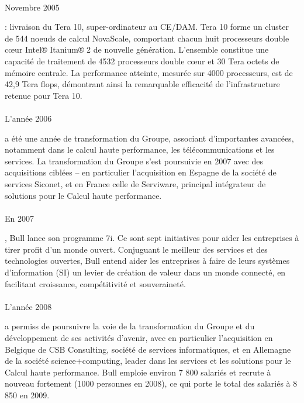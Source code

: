 \documentclass{article}
\begin{document}
		\paragraph{}
		\begin{bf}Novembre 2005\end{bf} : livraison du Tera 10, super-ordinateur au CE/DAM. Tera 10 forme un cluster de 
		544 noeuds de calcul NovaScale, comportant chacun huit processeurs double cœur Intel® Itanium® 2 de nouvelle 
		génération. L'ensemble constitue une capacité de traitement de 4532 processeurs double cœur et 30 Tera octets de 
		mémoire centrale. La performance atteinte, mesurée sur 4000 processeurs, est de 42,9 Tera flops, démontrant ainsi la 
		remarquable efficacité de l’infrastructure retenue pour Tera 10.
		\paragraph{}
		\begin{bf}L’année 2006\end{bf} a été une année de transformation du Groupe, associant d’importantes avancées, 
		notamment dans le calcul haute performance, les télécommunications et les services.
		La transformation du Groupe s’est poursuivie en 2007 avec des acquisitions ciblées – en particulier l’acquisition 
		en Espagne de la société de services Siconet, et en France celle de Serviware, principal intégrateur de solutions pour 
		le Calcul haute performance.
		\paragraph{}
		\begin{bf}En 2007\end{bf}, Bull lance son programme 7i. Ce sont sept initiatives pour aider les entreprises à 
		tirer profit d’un monde ouvert. Conjuguant le meilleur des services et des technologies ouvertes, Bull entend aider 
		les entreprises à faire de leurs systèmes d’information (SI) un levier de création de valeur dans un monde connecté, 
		en facilitant croissance, compétitivité et souveraineté.
		\paragraph{}
		\begin{bf}L’année 2008\end{bf} a permiss de poursuivre la voie de la transformation du Groupe et du développement de 
		ses activités d’avenir, avec en particulier l’acquisition en Belgique de CSB Consulting, société de services 
		informatiques, et en Allemagne de la société science+computing, leader dans les services et les solutions pour le 
		Calcul haute performance.
		Bull emploie environ 7 800 salariés et recrute à nouveau fortement (1000 personnes en 2008), ce qui porte le total des 
		salariés à 8 850 en 2009.
\end{document}
